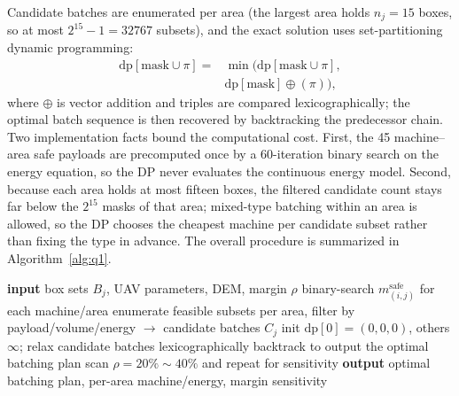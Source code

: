 \documentclass[journal]{IEEEtran}
\begin{document}
Candidate batches are enumerated per area (the largest area holds $n_j=15$
boxes, so at most $2^{15}-1=32767$ subsets), and the exact solution uses
set-partitioning dynamic programming:
\begin{equation}
\begin{aligned}
\mathrm{dp}[\text{mask}\cup\pi]={}&\min\big(\mathrm{dp}[\text{mask}\cup\pi],\\
&\mathrm{dp}[\text{mask}]\oplus(\pi)\big),
\end{aligned}
\end{equation}
where $\oplus$ is vector addition and triples are compared lexicographically;
the optimal batch sequence is then recovered by backtracking the predecessor
chain. Two implementation facts bound the computational cost. First, the 45
machine--area safe payloads are precomputed once by a 60-iteration binary
search on the energy equation, so the DP never evaluates the continuous energy
model. Second, because each area holds at most fifteen boxes, the filtered
candidate count stays far below the $2^{15}$ masks of that area; mixed-type
batching within an area is
allowed, so the DP chooses the cheapest machine per candidate subset rather
than fixing the type in advance. The overall procedure is summarized in Algorithm~\ref{alg:q1}.

\begin{algorithm}[t]
\caption{Exact batching (subset enumeration + set-partitioning DP)}
\label{alg:q1}
\begin{algorithmic}[1]
\STATE \textbf{input} box sets $B_j$, UAV parameters, DEM, margin $\rho$
\STATE binary-search $m^{\mathrm{safe}}_{(i,j)}$ for each machine/area
\STATE enumerate feasible subsets per area, filter by payload/volume/energy $\to$ candidate batches $C_j$
\STATE init $\mathrm{dp}[0]=(0,0,0)$, others $\infty$; relax candidate batches lexicographically
\STATE backtrack to output the optimal batching plan
\STATE scan $\rho=20\%\sim40\%$ and repeat for sensitivity
\STATE \textbf{output} optimal batching plan, per-area machine/energy, margin sensitivity
\end{algorithmic}
\end{algorithm}
\end{document}
